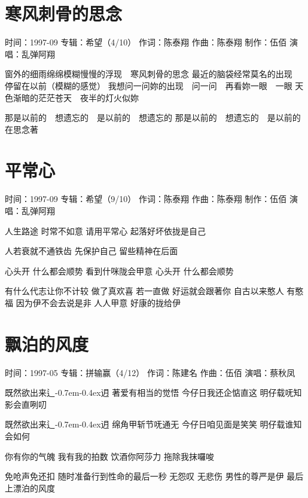 \documentclass[UTF8,a4paper,oneside,twocolumn,12pt]{ctexbook}
\newcommand{\infopair}[2]{\textbullet #1：#2}
\newcommand{\zc}[1][伍佰]{\infopair{作词}{#1}}
\newcommand{\zq}[1][伍佰]{\infopair{作曲}{#1}}
\newcommand{\zj}[1]{\infopair{专辑}{#1}}
\newcommand{\zz}[1]{\infopair{制作}{#1}}
\newcommand{\sj}[1]{\infopair{时间}{#1}}
\newcommand{\tshittho}{\hbox{辶\kern-0.7em\lower-0.4ex\hbox{\scalebox{0.7}{日}}}迌}
\newenvironment{info}{\begin{flushleft}\kaishu
	}
	{\end{flushleft}\normalsize\yahei\par}
\newenvironment{lyric}{
	}
{}
\begin{document}
\section{寒风刺骨的思念}
\begin{info}
	\sj{1997-09}
	\zj{希望（4/10）}
	\zc[陈泰翔]
	\zq[陈泰翔]
	\zz{伍佰}
	\infopair{演唱}{乱弹阿翔}
\end{info}
\begin{lyric}
	窗外的细雨绵绵模糊慢慢的浮现　寒风刺骨的思念
	最近的脑袋经常莫名的出现　停留在以前（模糊的感觉）
	我想问一问妳的出现　问一问　再看妳一眼　一眼
	天色渐暗的茫茫苍天　夜半的灯火似妳

	那是以前的　想遗忘的　是以前的　想遗忘的
	那是以前的　想遗忘的　是以前的　在思念著
\end{lyric}

\section{平常心}
\begin{info}
	\sj{1997-09}
	\zj{希望（9/10）}
	\zc[陈泰翔]
	\zq[陈泰翔]
	\zz{伍佰}
	\infopair{演唱}{乱弹阿翔}
\end{info}
\begin{lyric}
	人生路途 时常不如意 请用平常心
	起落好坏依拢是自己

	人若衰就不通铁齿 先保护自己
	留些精神在后面

	心头开 什么都会顺势
	看到什咪陇会甲意
	心头开 什么都会顺势

	有什么代志让你不计较 做了真欢喜
	若一直做 好运就会跟著你
	自古以来憨人 有憨福
	因为伊不会去说是非 人人甲意
	好康的拢给伊
\end{lyric}

\section{飘泊的风度}
\begin{info}
	\sj{1997-05}
	\zj{拼输赢（4/12）}
	\zc[陈建名]
	\zq
	\infopair{演唱}{蔡秋凤}
\end{info}
\begin{lyric}
	既然欲出来\tshittho{} 著爱有相当的觉悟
	今仔日我还企惦直这 明仔载呒知影会直咧叨

	既然欲出来\tshittho{} 绵角甲斩节呒通无
	今仔日咱见面是笑笑 明仔载谁知会如何

	你有你的气魄 我有我的拍数
	饮酒你阿莎力 拖除我抹囉唆

	免呛声免还扣 随时准备行到性命的最后一秒
	无怨叹 无悲伤
	男性的尊严是伊 最后上漂泊的风度
\end{lyric}
\end{document}
